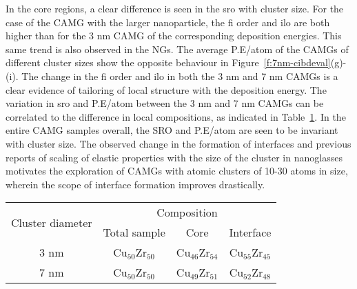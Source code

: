 In the core regions, a clear difference is seen in the \gls{sro} with cluster size. For the case of the CAMG with the larger nanoparticle, the \gls{fi} order and \gls{ilo} are both higher than for the 3 nm CAMG of the corresponding deposition energies. This same trend is also observed in the NGs. The average P.E/atom of the CAMGs of different cluster sizes show the opposite behaviour in Figure~\ref{f:7nm-cibdeval}(g)-(i). The change in the \gls{fi} order and \gls{ilo} in both the 3 nm and 7 nm CAMGs is a clear evidence of tailoring of local structure with the deposition energy. The variation in \gls{sro} and P.E/atom between the 3 nm and 7 nm CAMGs can be correlated to the difference in local compositions, as indicated in Table~\ref{t:chem_heter}. In the entire CAMG samples overall, the SRO and P.E/atom are seen to be invariant with cluster size. The observed change in the formation of interfaces and previous reports of scaling of elastic properties with the size of the cluster in nanoglasses \cite{Cheng2019a} motivates the exploration of CAMGs with atomic clusters of 10-30 atoms in size, wherein the scope of interface formation improves drastically. \par 

\begin{table} \centering
	\begin{tabular}{c c c c} 
		\hline \hline	
	    \multirow{2}{2cm}{\centering Cluster diameter} & \multicolumn{3}{c}{Composition}\\
		 & Total sample & Core & Interface \\
		\hline	
		3 nm	& Cu$_{50}$Zr$_{50}$ & Cu$_{46}$Zr$_{54}$ & Cu$_{55}$Zr$_{45}$ \\
		7 nm	& Cu$_{50}$Zr$_{50}$ & Cu$_{49}$Zr$_{51}$ & Cu$_{52}$Zr$_{48}$ \\
		\hline \hline	
	\end{tabular}
	\label{t:chem_heter}
\end{table}

